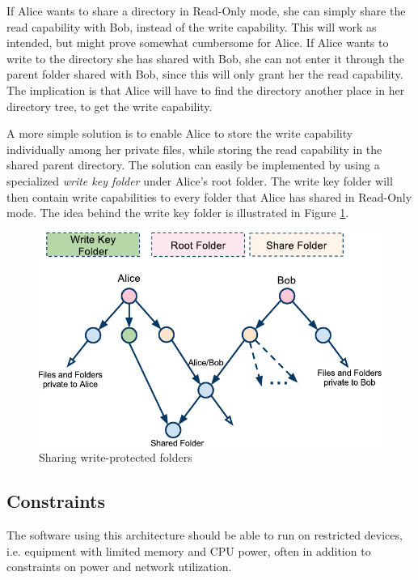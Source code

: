 \documentclass[pdftex,english,10pt,b5paper,twoside]{book}
\begin{document}
If Alice wants to share a directory in Read-Only mode, she can simply share the
read capability with Bob, instead of the write capability. This will work as
intended, but might prove somewhat cumbersome for Alice. If Alice wants to
write to the directory she has shared with Bob, she can not enter it through
the parent folder shared with Bob, since this will only grant her the read
capability. The implication is that Alice will have to find the directory
another place in her directory tree, to get the write capability.

A more simple solution is to enable Alice to store the write capability
individually among her private files, while storing the read capability in the
shared parent directory. The solution can easily be implemented by using a
specialized \emph{write key folder} under Alice's root folder. The write key
folder will then contain write capabilities to every folder that Alice has
shared in Read-Only mode. The idea behind the write key folder is illustrated
in Figure \ref{fig:AS:readonly}.

\begin{figure}[h!]
    \centering
    \includegraphics[width=\columnwidth]{ArchitectureShareReadOnlyFolder.pdf}
    \caption{Sharing write-protected folders}
    \label{fig:AS:readonly}
\end{figure}

\subsection{Constraints}

The software using this architecture should be able to run on restricted
devices, i.e. equipment with limited memory and \ac{CPU} power, often in
addition to constraints on power and network utilization.
\end{document}

